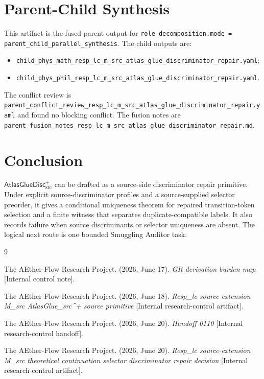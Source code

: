 \documentclass[11pt]{article}
\newcommand{\AtlasGlueDisc}{\mathsf{AtlasGlueDisc}_{\mathrm{src}}^{+}}
\begin{document}
\section{Parent-Child Synthesis}

This artifact is the fused parent output for
\texttt{role\_decomposition.mode = parent\_child\_parallel\_synthesis}. The
child outputs are:
\begin{itemize}
  \item \texttt{child\_phys\_math\_resp\_lc\_m\_src\_atlas\_glue\_discriminator\_repair.yaml};
  \item \texttt{child\_phys\_phil\_resp\_lc\_m\_src\_atlas\_glue\_discriminator\_repair.yaml}.
\end{itemize}
The conflict review is
\texttt{parent\_conflict\_review\_resp\_lc\_m\_src\_atlas\_glue\_discriminator\_repair.yaml}
and found no blocking conflict. The fusion notes are
\texttt{parent\_fusion\_notes\_resp\_lc\_m\_src\_atlas\_glue\_discriminator\_repair.md}.

\section{Conclusion}

\(\AtlasGlueDisc\) can be drafted as a source-side discriminator repair
primitive. Under explicit source-discriminator profiles and a source-supplied
selector preorder, it gives a conditional uniqueness theorem for repaired
transition-token selection and a finite witness that separates
duplicate-compatible labels. It also records failure when source discriminants
or selector uniqueness are absent. The logical next route is one bounded
Smuggling Auditor task.

\begin{thebibliography}{9}

The AEther-Flow Research Project. (2026, June 17). \emph{GR derivation burden
map} [Internal control note].

The AEther-Flow Research Project. (2026, June 18). \emph{Resp\_lc
source-extension M\_src AtlasGlue\_src\^{}+ source primitive} [Internal
research-control artifact].

The AEther-Flow Research Project. (2026, June 20). \emph{Handoff 0110}
[Internal research-control handoff].

The AEther-Flow Research Project. (2026, June 20). \emph{Resp\_lc
source-extension M\_src theoretical continuation selector discriminator
repair decision} [Internal research-control artifact].

\end{thebibliography}
\end{document}
